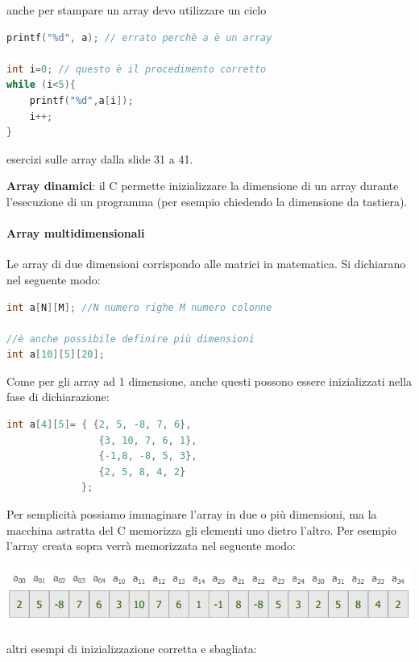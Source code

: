 \documentclass[
  paper=a4,
  oneside  ,captions=tableheading
]{scrbook}
\begin{document}
anche per stampare un array devo utilizzare un ciclo

\begin{lstlisting}[language={C++}]
printf("%d", a); // errato perchè a è un array

int i=0; // questo è il procedimento corretto
while (i<5){
    printf("%d",a[i]);
    i++;
} 
\end{lstlisting}

esercizi sulle array dalla slide 31 a 41.

\textbf{Array dinamici}: il C permette inizializzare la dimensione di un
array durante l'esecuzione di un programma (per esempio chiedendo la
dimensione da tastiera).

\hypertarget{array-multidimensionali}{%
\paragraph{Array multidimensionali}\label{array-multidimensionali}}

Le array di due dimensioni corrispondo alle matrici in matematica. Si
dichiarano nel seguente modo:

\begin{lstlisting}[language={C++}]
int a[N][M]; //N numero righe M numero colonne

//è anche possibile definire più dimensioni
int a[10][5][20];
\end{lstlisting}

Come per gli array ad 1 dimensione, anche questi possono essere
inizializzati nella fase di dichiarazione:

\begin{lstlisting}[language={C++}]
int a[4][5]= { {2, 5, -8, 7, 6},
                {3, 10, 7, 6, 1},
                {-1,8, -8, 5, 3},
                {2, 5, 8, 4, 2}
             };
\end{lstlisting}

Per semplicità possiamo immaginare l'array in due o più dimensioni, ma
la macchina astratta del C memorizza gli elementi uno dietro l'altro.
Per esempio l'array creata sopra verrà memorizzata nel seguente modo:

\includegraphics{./image/image-20201208150630550.png}

altri esempi di inizializzazione corretta e sbagliata:
\end{document}
